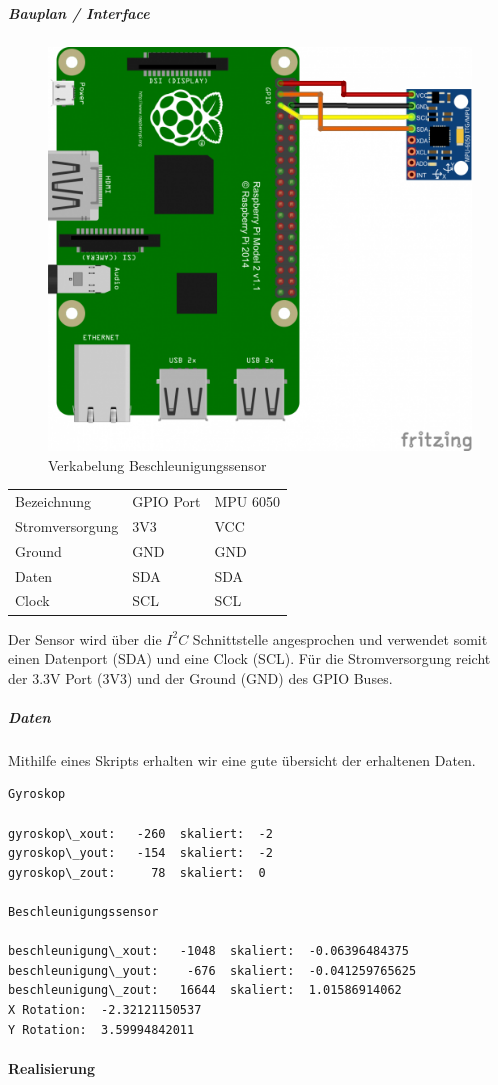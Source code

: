 \documentclass[../../main.tex]{subfiles}
\begin{document}
\subparagraph{Bauplan / Interface}
\begin{figure}[H] \centering
  \includegraphics{Verkabelung_BeschlSensor}
  \caption{Verkabelung Beschleunigungssensor}
  \label{fig:Beschleunigungssensor}
\end{figure}

\begin{table}[] \centering
\begin{tabular}{lll}
Bezeichnung     & GPIO Port & MPU 6050 \\
Stromversorgung & 3V3      & VCC      \\
Ground          & GND      & GND      \\
Daten          & SDA      & SDA      \\
Clock          & SCL      & SCL
\end{tabular}
\end{table}

Der Sensor wird über die $I^2C$ Schnittstelle angesprochen und verwendet somit einen Datenport (SDA) und eine Clock (SCL). Für die Stromversorgung reicht der 3.3V Port (3V3) und der Ground (GND) des GPIO Buses.

\subparagraph{Daten}
Mithilfe eines Skripts erhalten wir eine gute übersicht der erhaltenen Daten.

\begin{lstlisting}
Gyroskop

gyroskop\_xout:   -260  skaliert:  -2
gyroskop\_yout:   -154  skaliert:  -2
gyroskop\_zout:     78  skaliert:  0

Beschleunigungssensor

beschleunigung\_xout:   -1048  skaliert:  -0.06396484375
beschleunigung\_yout:    -676  skaliert:  -0.041259765625
beschleunigung\_zout:   16644  skaliert:  1.01586914062
X Rotation:  -2.32121150537
Y Rotation:  3.59994842011
\end{lstlisting}

\paragraph{Realisierung}
\end{document}
